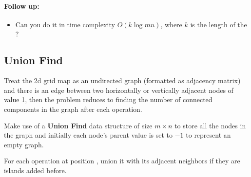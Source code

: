 \paragraph{Follow up:}

\begin{itemize}
\item Can you do it in time complexity $O(k \log mn)$, where $k$ is the length of the ?
\end{itemize}

\subsection{Union Find}
Treat the 2d grid map as an undirected graph (formatted as adjacency matrix) and there is an edge between two horizontally or vertically adjacent nodes of value 1, then the problem reduces to finding the number of connected components in the graph after each  operation.

Make use of a \textbf{Union Find} data structure of size $m\times n$ to store all the nodes in the graph and initially each node's parent value is set to $-1$ to represent an empty graph. 

For each  operation at position , union it with its adjacent neighbors if they are islands added before. 


